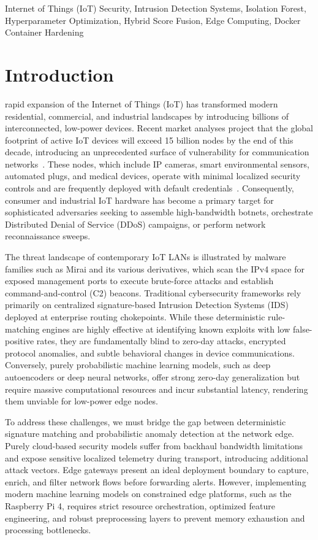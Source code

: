 \documentclass[journal]{IEEEtran}
\begin{document}
\begin{IEEEkeywords}
Internet of Things (IoT) Security, Intrusion Detection Systems, Isolation Forest, Hyperparameter Optimization, Hybrid Score Fusion, Edge Computing, Docker Container Hardening
\end{IEEEkeywords}

\section{Introduction}
 rapid expansion of the Internet of Things (IoT) has transformed modern residential, commercial, and industrial landscapes by introducing billions of interconnected, low-power devices. Recent market analyses project that the global footprint of active IoT devices will exceed 15 billion nodes by the end of this decade, introducing an unprecedented surface of vulnerability for communication networks~\cite{roman2013features, hassija2019present}. These nodes, which include IP cameras, smart environmental sensors, automated plugs, and medical devices, operate with minimal localized security controls and are frequently deployed with default credentials~\cite{raza2013securing, ammer2006wireless}. Consequently, consumer and industrial IoT hardware has become a primary target for sophisticated adversaries seeking to assemble high-bandwidth botnets, orchestrate Distributed Denial of Service (DDoS) campaigns, or perform network reconnaissance sweeps.

The threat landscape of contemporary IoT LANs is illustrated by malware families such as Mirai and its various derivatives, which scan the IPv4 space for exposed management ports to execute brute-force attacks and establish command-and-control (C2) beacons. Traditional cybersecurity frameworks rely primarily on centralized signature-based Intrusion Detection Systems (IDS)~\cite{liao2013intrusion, debar1999towards, bace2001nist} deployed at enterprise routing chokepoints. While these deterministic rule-matching engines are highly effective at identifying known exploits with low false-positive rates, they are fundamentally blind to zero-day attacks, encrypted protocol anomalies, and subtle behavioral changes in device communications. Conversely, purely probabilistic machine learning models, such as deep autoencoders or deep neural networks, offer strong zero-day generalization but require massive computational resources and incur substantial latency, rendering them unviable for low-power edge nodes.

To address these challenges, we must bridge the gap between deterministic signature matching and probabilistic anomaly detection at the network edge. Purely cloud-based security models suffer from backhaul bandwidth limitations and expose sensitive localized telemetry during transport, introducing additional attack vectors. Edge gateways present an ideal deployment boundary to capture, enrich, and filter network flows before forwarding alerts. However, implementing modern machine learning models on constrained edge platforms, such as the Raspberry Pi 4, requires strict resource orchestration, optimized feature engineering, and robust preprocessing layers to prevent memory exhaustion and processing bottlenecks.
\end{document}
